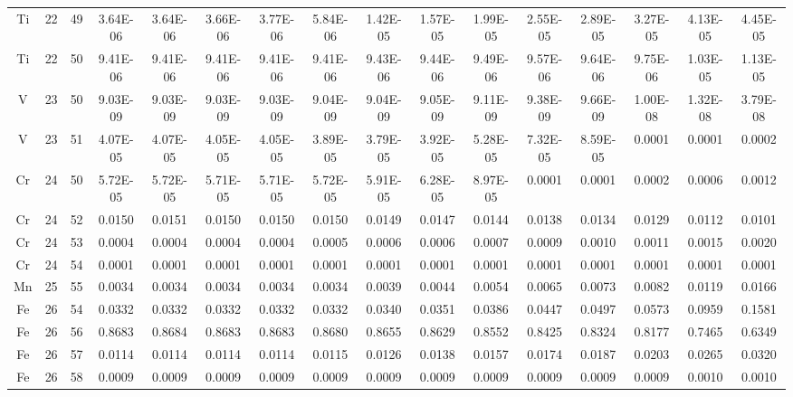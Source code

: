 {\begin{tabular}{|c|c|c|c|c|c|c|c|c|c|c|c|c|c|c|c|}
Ti & 22 & 49   & 3.64E-06 & 3.64E-06 & 3.66E-06 & 3.77E-06 & 5.84E-06 & 1.42E-05 & 1.57E-05 & 1.99E-05 & 2.55E-05 & 2.89E-05 & 3.27E-05 & 4.13E-05 & 4.45E-05 \\
Ti & 22 & 50   & 9.41E-06 & 9.41E-06 & 9.41E-06 & 9.41E-06 & 9.41E-06 & 9.43E-06 & 9.44E-06 & 9.49E-06 & 9.57E-06 & 9.64E-06 & 9.75E-06 & 1.03E-05 & 1.13E-05 \\
V  & 23 & 50   & 9.03E-09 & 9.03E-09 & 9.03E-09 & 9.03E-09 & 9.04E-09 & 9.04E-09 & 9.05E-09 & 9.11E-09 & 9.38E-09 & 9.66E-09 & 1.00E-08 & 1.32E-08 & 3.79E-08 \\
V  & 23 & 51   & 4.07E-05 & 4.07E-05 & 4.05E-05 & 4.05E-05 & 3.89E-05 & 3.79E-05 & 3.92E-05 & 5.28E-05 & 7.32E-05 & 8.59E-05 & 0.0001   & 0.0001   & 0.0002   \\
Cr & 24 & 50   & 5.72E-05 & 5.72E-05 & 5.71E-05 & 5.71E-05 & 5.72E-05 & 5.91E-05 & 6.28E-05 & 8.97E-05 & 0.0001   & 0.0001   & 0.0002   & 0.0006   & 0.0012   \\
Cr & 24 & 52   & 0.0150   & 0.0151   & 0.0150   & 0.0150   & 0.0150   & 0.0149   & 0.0147   & 0.0144   & 0.0138   & 0.0134   & 0.0129   & 0.0112   & 0.0101   \\
Cr & 24 & 53   & 0.0004   & 0.0004   & 0.0004   & 0.0004   & 0.0005   & 0.0006   & 0.0006   & 0.0007   & 0.0009   & 0.0010   & 0.0011   & 0.0015   & 0.0020   \\
Cr & 24 & 54   & 0.0001   & 0.0001   & 0.0001   & 0.0001   & 0.0001   & 0.0001   & 0.0001   & 0.0001   & 0.0001   & 0.0001   & 0.0001   & 0.0001   & 0.0001   \\
Mn & 25 & 55   & 0.0034   & 0.0034   & 0.0034   & 0.0034   & 0.0034   & 0.0039   & 0.0044   & 0.0054   & 0.0065   & 0.0073   & 0.0082   & 0.0119   & 0.0166   \\
Fe & 26 & 54   & 0.0332   & 0.0332   & 0.0332   & 0.0332   & 0.0332   & 0.0340   & 0.0351   & 0.0386   & 0.0447   & 0.0497   & 0.0573   & 0.0959   & 0.1581   \\
Fe & 26 & 56   & 0.8683   & 0.8684   & 0.8683   & 0.8683   & 0.8680   & 0.8655   & 0.8629   & 0.8552   & 0.8425   & 0.8324   & 0.8177   & 0.7465   & 0.6349   \\
Fe & 26 & 57   & 0.0114   & 0.0114   & 0.0114   & 0.0114   & 0.0115   & 0.0126   & 0.0138   & 0.0157   & 0.0174   & 0.0187   & 0.0203   & 0.0265   & 0.0320   \\
Fe & 26 & 58   & 0.0009   & 0.0009   & 0.0009   & 0.0009   & 0.0009   & 0.0009   & 0.0009   & 0.0009   & 0.0009   & 0.0009   & 0.0009   & 0.0010   & 0.0010   \\

\end{tabular}}
